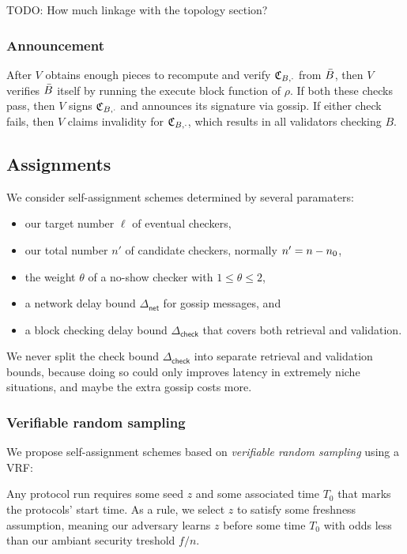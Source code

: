 TODO: How much linkage with the topology section?

\subsubsection{Announcement}

After $V$ obtains enough pieces to recompute and verify $\mathfrak{C}_{B,\cdot}$ from $\bar{B}$, then $V$ verifies $\bar{B}$ itself by running the execute block function of $\rho$.  If both these checks pass, then $V$ signs $\mathfrak{C}_{B,\cdot}$ and announces its signature via gossip.  If either check fails, then $V$ claims invalidity for $\mathfrak{C}_{B,\cdot}$, which results in all validators checking $B$.


\subsection{Assignments}
\label{sec:assignment}

\newcommand\netdelay{\ensuremath{\Delta_{\mathsf{net}}}}
\newcommand\checkdelay{\ensuremath{\Delta_{\mathsf{check}}}}

We consider self-assignment schemes determined by several paramaters:
\begin{itemize}
\item our target number $\ell$ of eventual checkers,
\item our total number $n'$ of candidate checkers, normally $n' = n - n_0$,
\item the weight $\theta$ of a no-show checker with $1 \leq \theta \leq 2$,
\item a network delay bound $\netdelay$ for gossip messages, and
\item a block checking delay bound $\checkdelay$ that covers both retrieval and validation.
\end{itemize}
We never split the check bound $\checkdelay$ into separate retrieval and validation bounds, because doing so could only improves latency in extremely niche situations, and maybe the extra gossip costs more. 

\subsubsection{Verifiable random sampling}

We propose self-assignment schemes based on {\em verifiable random sampling} using a VRF:  

Any protocol run requires some seed $z$ and some associated time $T_0$ that marks the protocols' start time.  As a rule, we select $z$ to satisfy some freshness assumption, meaning our adversary learns $z$ before some time $T_0$ with odds less than our ambiant security treshold $f/n$.

